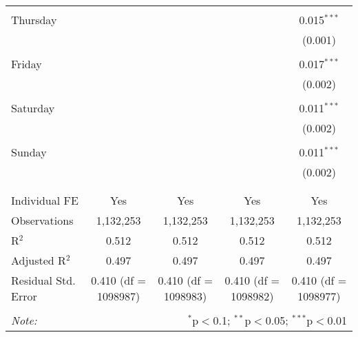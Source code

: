 \documentclass[
]{article}
\begin{document}
\begin{table}[!htbp]
{\begin{tabular}{@{\extracolsep{5pt}}lcccc}
  & & & & \\ 
 Thursday &  &  &  & 0.015$^{***}$ \\ 
  &  &  &  & (0.001) \\ 
  & & & & \\ 
 Friday &  &  &  & 0.017$^{***}$ \\ 
  &  &  &  & (0.002) \\ 
  & & & & \\ 
 Saturday &  &  &  & 0.011$^{***}$ \\ 
  &  &  &  & (0.002) \\ 
  & & & & \\ 
 Sunday &  &  &  & 0.011$^{***}$ \\ 
  &  &  &  & (0.002) \\ 
  & & & & \\ 
\hline \\[-1.8ex] 
Individual FE & Yes & Yes & Yes & Yes \\ 
Observations & 1,132,253 & 1,132,253 & 1,132,253 & 1,132,253 \\ 
R$^{2}$ & 0.512 & 0.512 & 0.512 & 0.512 \\ 
Adjusted R$^{2}$ & 0.497 & 0.497 & 0.497 & 0.497 \\ 
Residual Std. Error & 0.410 (df = 1098987) & 0.410 (df = 1098983) & 0.410 (df = 1098982) & 0.410 (df = 1098977) \\ 
\hline 
\hline \\[-1.8ex] 
\textit{Note:}  & \multicolumn{4}{r}{$^{*}$p$<$0.1; $^{**}$p$<$0.05; $^{***}$p$<$0.01} \\ 
\end{tabular}
} 
\end{table} 
\newpage
\end{document}
